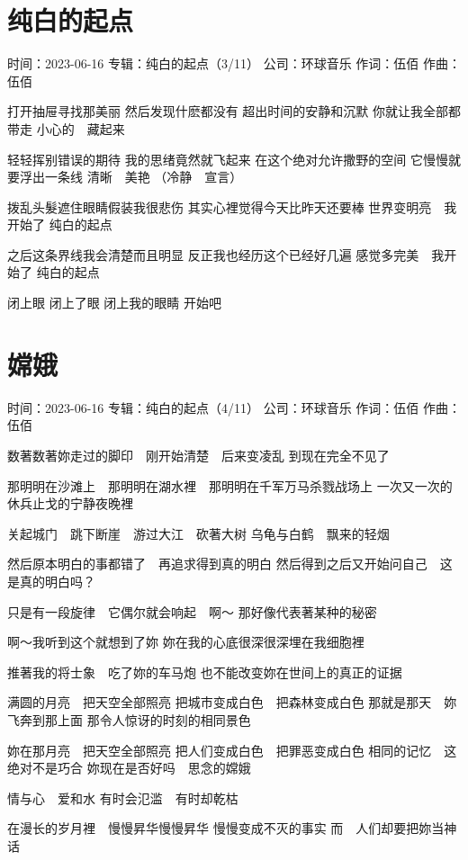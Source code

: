 \documentclass[UTF8,a4paper,oneside,twocolumn,12pt]{ctexbook}
\newcommand{\infopair}[2]{\textbullet #1：#2}
\newcommand{\zc}[1][伍佰]{\infopair{作词}{#1}}
\newcommand{\zq}[1][伍佰]{\infopair{作曲}{#1}}
\newcommand{\zj}[1]{\infopair{专辑}{#1}}
\newcommand{\sj}[1]{\infopair{时间}{#1}}
\newcommand{\gs}[1]{\infopair{公司}{#1}}
\newenvironment{info}{\begin{flushleft}\kaishu
	}
	{\end{flushleft}\normalsize\yahei\par}
\newenvironment{lyric}{
	}
{}
\begin{document}
\section{纯白的起点}
\begin{info}
	\sj{2023-06-16}
	\zj{纯白的起点（3/11）}
	\gs{环球音乐}
	\zc
	\zq
\end{info}
\begin{lyric}%
	打开抽屉寻找那美丽
	然后发现什麽都没有
	超出时间的安静和沉默
	你就让我全部都带走
	小心的　藏起来

	轻轻挥别错误的期待
	我的思绪竟然就飞起来
	在这个绝对允许撒野的空间
	它慢慢就要浮出一条线
	清晰　美艳
	（冷静　宣言）

	拨乱头髮遮住眼睛假装我很悲伤
	其实心裡觉得今天比昨天还要棒
	世界变明亮　我开始了
	纯白的起点

	之后这条界线我会清楚而且明显
	反正我也经历这个已经好几遍
	感觉多完美　我开始了
	纯白的起点

	闭上眼
	闭上了眼
	闭上我的眼睛
	开始吧
\end{lyric}

\section{嫦娥}
\begin{info}
	\sj{2023-06-16}
	\zj{纯白的起点（4/11）}
	\gs{环球音乐}
	\zc
	\zq
\end{info}
\begin{lyric}
	数著数著妳走过的脚印　刚开始清楚　后来变凌乱
	到现在完全不见了

	那明明在沙滩上　那明明在湖水裡　那明明在千军万马杀戮战场上
	一次又一次的休兵止戈的宁静夜晚裡

	关起城门　跳下断崖　游过大江　砍著大树
	乌龟与白鹤　飘来的轻烟

	然后原本明白的事都错了　再追求得到真的明白
	然后得到之后又开始问自己　这是真的明白吗？

	只是有一段旋律　它偶尔就会响起　啊～
	那好像代表著某种的秘密

	啊～我听到这个就想到了妳
	妳在我的心底很深很深埋在我细胞裡

	推著我的将士象　吃了妳的车马炮
	也不能改变妳在世间上的真正的证据

	满圆的月亮　把天空全部照亮
	把城市变成白色　把森林变成白色
	那就是那天　妳飞奔到那上面
	那令人惊讶的时刻的相同景色

	妳在那月亮　把天空全部照亮
	把人们变成白色　把罪恶变成白色
	相同的记忆　这绝对不是巧合
	妳现在是否好吗　思念的嫦娥

	情与心　爱和水
	有时会氾滥　有时却乾枯

	在漫长的岁月裡　慢慢昇华慢慢昇华
	慢慢变成不灭的事实
	而　人们却要把妳当神话
\end{lyric}
\end{document}
